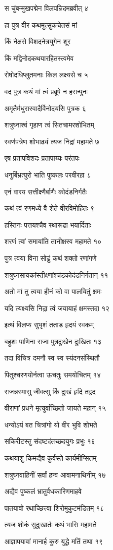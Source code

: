 स चुंबन्मुखपद्मेन विलपन्निदमब्रवीत् ४

हा पुत्र वीर कथमुत्सुकचेतसं मां

किं नेक्षसे विशदनेत्रयुगेन शूर

किं मद्विनोदकथयारहितस्त्वमेव

रोषोदधिप्लुतमनाः किल लक्ष्यसे च ५

वद पुत्र कथं मां त्वं प्रब्रूषे न हसन्पुनः

अमृतैर्मधुरास्वादैर्विनोदयसि पुत्रक ६

शत्रुघ्नाश्वं गृहाण त्वं सितचामरशोभितम्

स्वर्णपत्रेण शोभाढ्यं त्यज निद्रां महामते ७

एष प्रतापविशदः प्रतापाग्र्यः परंतपः

धनुर्बिभ्रत्पुरो भाति पुष्कलः परवीरहा ८

एनं वारय सत्तीक्ष्णैर्बाणैः कोदंडनिर्गतैः

कथं त्वं रणमध्ये वै शेते वीरविमोहितः ९

हस्तिनः पत्तयश्चैव रथारूढा भयार्दिताः

शरणं त्वां समायांति तानीक्षस्व महामते १०

पुत्र त्वया विना सोढुं कथं शक्तो रणांगणे

शत्रुघ्नसायकांस्तीक्ष्णांश्चंडकोदंडनिर्गतान् ११

अतो मां तु त्वया हीनं को वा पालयितुं क्षमः

यदि त्यक्ष्यसि निद्रा त्वं जयायाहं क्षमस्तदा १२

इत्थं विलप्य सुभृशं तताड हृदयं स्वकम्

बहुशः पाणिना राजा पुत्रदुःखेन दुःखितः १३

तदा विचित्र दमनौ स्व स्व स्यंदनसंस्थितौ

पितुश्चरणयोर्नत्वा ऊचतुः समयोचितम् १४

राजन्नस्मासु जीवत्सु किं दुःखं हृदि तद्वद

वीराणां प्रधने मृत्युर्वांच्छितो जायते महान् १५

धन्योऽयं बत चित्रांगो यो वीर भुवि शोभते

सकिरीटस्तु संदष्टदंतच्छदयुगः प्रभुः १६

कथयाशु किमद्यैव कुर्वस्ते कार्यमीप्सितम्

शत्रुघ्नवाहिनीं सर्वां हन्व आवामनाथिनीम् १७

अद्यैव पुष्कलं भ्रातुर्वधकारिणमाहवे

पातयावो रथाच्छित्त्वा शिरोमुकुटमंडितम् १८

त्यज शोकं सुदुःखार्तः कथं भासि महामते

आज्ञापयावां मानार्ह कुरु युद्धे मतिं तथा १९

